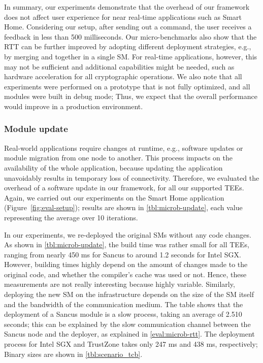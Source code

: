 In summary, our experiments demonstrate that the overhead of our framework does
not affect user experience for near real-time applications such as Smart Home.
Considering our setup, after sending out a command, the user receives a feedback
in less than 500 milliseconds. Our micro-benchmarks also show that the \ac{RTT}
can be further improved by adopting different deployment strategies, e.g., by
merging \web{} and \gateway{} together in a single \ac{SM}. For real-time
applications, however, this may not be sufficient and additional capabilities
might be needed, such as hardware acceleration for all cryptographic operations.
We also note that all experiments were performed on a prototype that is not
fully optimized, and all modules were built in debug mode; Thus, we expect that
the overall performance would improve in a production environment.

\subsubsection{Module update}
\label{eval:microb-update}



Real-world applications require changes at runtime, e.g., software updates or
module migration from one node to another. This process impacts on the
availability of the whole application, because updating the application
unavoidably results in temporary loss of connectivity. Therefore, we evaluated
the overhead of a software update in our framework, for all our supported
\acp{TEE}. Again, we carried out our experiments on the Smart Home application
(Figure~\ref{fig:eval-setup}); results are shown in \cref{tbl:microb-update},
each value representing the average over 10 iterations.

In our experiments, we re-deployed the original \acp{SM} without any code
changes. As shown in \cref{tbl:microb-update}, the build time was rather small
for all \acp{TEE}, ranging from nearly 450 ms for Sancus to around 1.2 seconds
for Intel \ac{SGX}. However, building times highly depend on the amount of
changes made to the original code, and whether the compiler's cache was used or
not. Hence, these measurements are not really interesting because highly
variable. Similarly, deploying the new \ac{SM} on the infrastructure depends on
the size of the \ac{SM} itself and the bandwidth of the communication medium.
The table shows that the deployment of a Sancus module is a slow process, taking
an average of 2.510 seconds; this can be explained by the slow communication
channel between the Sancus node and the deployer, as explained in
\cref{eval:microb-rtt}. The deployment process for Intel \ac{SGX} and TrustZone
takes only 247 ms and 438 ms, respectively; Binary sizes are shown in
\cref{tbl:scenario_tcb}.

